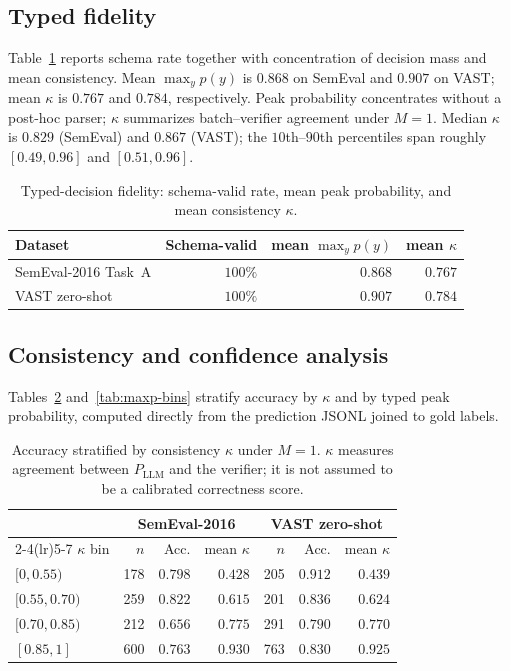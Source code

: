 \documentclass[10pt]{article}
\theoremstyle{definition}
\begin{document}
\subsection{Typed fidelity}
Table~\ref{tab:fidelity} reports schema rate together with concentration of decision mass and mean
consistency.
Mean $\max_y p(y)$ is $0.868$ on SemEval and $0.907$ on VAST; mean $\kappa$ is $0.767$ and $0.784$,
respectively.
Peak probability concentrates without a post-hoc parser; $\kappa$ summarizes batch--verifier agreement under
$M{=}1$.
Median $\kappa$ is $0.829$ (SemEval) and $0.867$ (VAST); the $10$th--$90$th percentiles span roughly
$[0.49,0.96]$ and $[0.51,0.96]$.

\begin{table}[H]
\centering
\small
\begin{tabular}{lrrr}
\toprule
Dataset & Schema-valid & mean $\max_y p(y)$ & mean $\kappa$ \\
\midrule
SemEval-2016 Task~A & $100\%$ & $0.868$ & $0.767$ \\
VAST zero-shot & $100\%$ & $0.907$ & $0.784$ \\
\bottomrule
\end{tabular}
\caption{Typed-decision fidelity: schema-valid rate, mean peak probability, and mean consistency $\kappa$.}
\label{tab:fidelity}
\end{table}

\subsection{Consistency and confidence analysis}
\label{sec:analysis}
Tables~\ref{tab:kappa-bins} and~\ref{tab:maxp-bins} stratify accuracy by $\kappa$ and by typed peak
probability, computed directly from the prediction JSONL joined to gold labels.

\begin{table}[H]
\centering
\small
\begin{tabular}{lrrrrrr}
\toprule
& \multicolumn{3}{c}{SemEval-2016} & \multicolumn{3}{c}{VAST zero-shot} \\
\cmidrule(lr){2-4}\cmidrule(lr){5-7}
$\kappa$ bin & $n$ & Acc. & mean $\kappa$ & $n$ & Acc. & mean $\kappa$ \\
\midrule
$[0,0.55)$ & 178 & $0.798$ & $0.428$ & 205 & $0.912$ & $0.439$ \\
$[0.55,0.70)$ & 259 & $0.822$ & $0.615$ & 201 & $0.836$ & $0.624$ \\
$[0.70,0.85)$ & 212 & $0.656$ & $0.775$ & 291 & $0.790$ & $0.770$ \\
$[0.85,1]$ & 600 & $0.763$ & $0.930$ & 763 & $0.830$ & $0.925$ \\
\bottomrule
\end{tabular}
\caption{Accuracy stratified by consistency $\kappa$ under $M{=}1$.
$\kappa$ measures agreement between $P_{\mathrm{LLM}}$ and the verifier; it is not assumed to be a
calibrated correctness score.}
\label{tab:kappa-bins}
\end{table}
\end{document}

